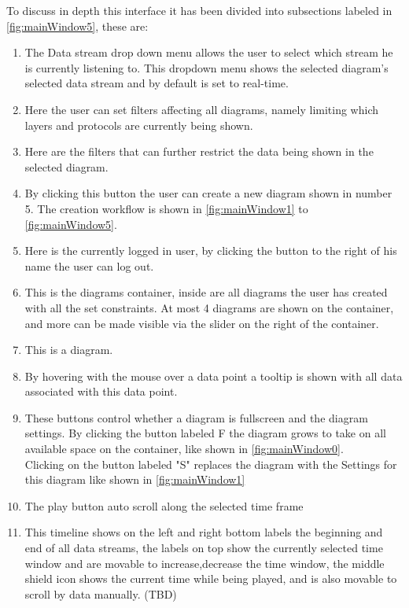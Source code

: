 \documentclass[twoside, english, draft]{Pflichtenheft}
\begin{document}
To discuss in depth this interface it has been divided into subsections labeled in \autoref{fig:mainWindow5}, these are:
\\
\begin{enumerate}
\item The Data stream drop down menu allows the user to select which stream he is currently listening to. This dropdown menu shows the selected diagram's selected data stream and by default is set to real-time.
\item Here the user can set filters affecting all diagrams, namely limiting which layers and protocols are currently being shown.
\item Here are the filters that can further restrict the data being shown in the selected diagram.
\item By clicking this button the user can create a new diagram shown in number 5. The creation workflow is shown in \autoref{fig:mainWindow1} to \autoref{fig:mainWindow5}.
\item Here is the currently logged in user, by clicking the button to the right of his name the user can log out.
\item This is the diagrams container, inside are all diagrams the user has created with all the set constraints. At most 4 diagrams are shown on the container, and more can be made visible via the slider on the right of the container.
\item This is a diagram.
\item By hovering with the mouse over a data point a tooltip is shown with all data associated with this data point.
\item These buttons control whether a diagram is fullscreen and the diagram settings. By clicking the button labeled F the diagram grows to take on all available space on the container, like shown in \autoref{fig:mainWindow0}.
\\
Clicking on the button labeled "S" replaces the diagram with the Settings for this diagram like shown in \autoref{fig:mainWindow1}
\item The play button auto scroll along the selected time frame
\item This timeline shows on the left and right bottom labels the beginning and end of all data streams, the labels on top show the currently selected time window and are movable to increase,decrease the time window, the middle shield icon shows the current time while being played, and is also movable to scroll by data manually. (TBD)

\end{enumerate}
\end{document}
